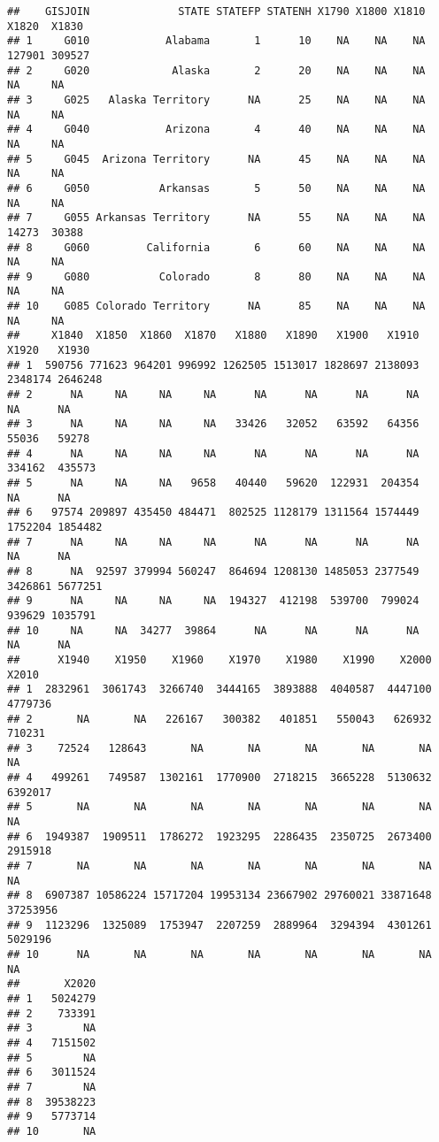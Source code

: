 \documentclass[
]{article}
\begin{document}
\begin{verbatim}
##    GISJOIN              STATE STATEFP STATENH X1790 X1800 X1810  X1820  X1830
## 1     G010            Alabama       1      10    NA    NA    NA 127901 309527
## 2     G020             Alaska       2      20    NA    NA    NA     NA     NA
## 3     G025   Alaska Territory      NA      25    NA    NA    NA     NA     NA
## 4     G040            Arizona       4      40    NA    NA    NA     NA     NA
## 5     G045  Arizona Territory      NA      45    NA    NA    NA     NA     NA
## 6     G050           Arkansas       5      50    NA    NA    NA     NA     NA
## 7     G055 Arkansas Territory      NA      55    NA    NA    NA  14273  30388
## 8     G060         California       6      60    NA    NA    NA     NA     NA
## 9     G080           Colorado       8      80    NA    NA    NA     NA     NA
## 10    G085 Colorado Territory      NA      85    NA    NA    NA     NA     NA
##     X1840  X1850  X1860  X1870   X1880   X1890   X1900   X1910   X1920   X1930
## 1  590756 771623 964201 996992 1262505 1513017 1828697 2138093 2348174 2646248
## 2      NA     NA     NA     NA      NA      NA      NA      NA      NA      NA
## 3      NA     NA     NA     NA   33426   32052   63592   64356   55036   59278
## 4      NA     NA     NA     NA      NA      NA      NA      NA  334162  435573
## 5      NA     NA     NA   9658   40440   59620  122931  204354      NA      NA
## 6   97574 209897 435450 484471  802525 1128179 1311564 1574449 1752204 1854482
## 7      NA     NA     NA     NA      NA      NA      NA      NA      NA      NA
## 8      NA  92597 379994 560247  864694 1208130 1485053 2377549 3426861 5677251
## 9      NA     NA     NA     NA  194327  412198  539700  799024  939629 1035791
## 10     NA     NA  34277  39864      NA      NA      NA      NA      NA      NA
##      X1940    X1950    X1960    X1970    X1980    X1990    X2000    X2010
## 1  2832961  3061743  3266740  3444165  3893888  4040587  4447100  4779736
## 2       NA       NA   226167   300382   401851   550043   626932   710231
## 3    72524   128643       NA       NA       NA       NA       NA       NA
## 4   499261   749587  1302161  1770900  2718215  3665228  5130632  6392017
## 5       NA       NA       NA       NA       NA       NA       NA       NA
## 6  1949387  1909511  1786272  1923295  2286435  2350725  2673400  2915918
## 7       NA       NA       NA       NA       NA       NA       NA       NA
## 8  6907387 10586224 15717204 19953134 23667902 29760021 33871648 37253956
## 9  1123296  1325089  1753947  2207259  2889964  3294394  4301261  5029196
## 10      NA       NA       NA       NA       NA       NA       NA       NA
##       X2020
## 1   5024279
## 2    733391
## 3        NA
## 4   7151502
## 5        NA
## 6   3011524
## 7        NA
## 8  39538223
## 9   5773714
## 10       NA
\end{verbatim}
\end{document}
